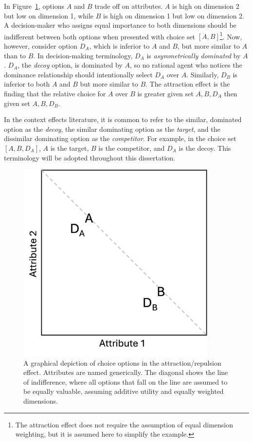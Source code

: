 In Figure~\ref{fig:att_stim}, options $A$ and $B$ trade off on attributes. $A$ is high on dimension 2 but low on dimension 1, while $B$ is high on dimension 1 but low on dimension 2. A decision-maker who assigns equal importance to both dimensions should be indifferent between both options when presented with choice set $[A,B]$\footnote{The attraction effect does not require the assumption of equal dimension weighting, but it is assumed here to simplify the example.}. Now, however, consider option $D_{A}$, which is inferior to $A$ and $B$, but more similar to $A$ than to $B$. In decision-making terminology, $D_{A}$ is \textit{asymmetrically dominated} by $A$. $D_{A}$, the \textit{decoy} option, is dominated by $A$, so no rational agent who notices the dominance relationship should intentionally select $D_{A}$ over $A$. Similarly, $D_{B}$ is inferior to both $A$ and $B$ but more similar to $B$. The attraction effect is the finding that the relative choice for $A$ over $B$ is greater given set ${A,B,D_{A}}$ then given set $A,B,D_{B}$. 

In the context effects literature, it is common to refer to the similar, dominated option as the \textit{decoy}, the similar dominating option as the \textit{target}, and the dissimilar dominating option as the \textit{competitor}. For example, in the choice set $[A,B,D_{A}]$, $A$ is the target, $B$ is the competitor, and $D_{A}$ is the decoy. This terminology will be adopted throughout this dissertation.

\begin{figure}
  \centering
   \includegraphics[width=100mm]{figures/att_stim.jpg}
   \caption{A graphical depiction of choice options in the attraction/repulsion effect. Attributes are named generically. The diagonal shows the line of indifference, where all options that fall on the line are assumed to be equally valuable, assuming additive utility and equally weighted dimensions.}
   \label{fig:att_stim}
\end{figure}

